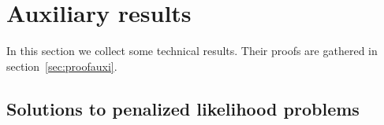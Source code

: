 \documentclass[aos]{imsart}
\theoremstyle{plain}
\begin{document}



\section{Auxiliary results}\label{auxiliary}

In this section we collect some technical results. Their proofs are gathered in section~\ref{sec:proofauxi}. 

\subsection{Solutions to penalized likelihood problems}
\end{document}
